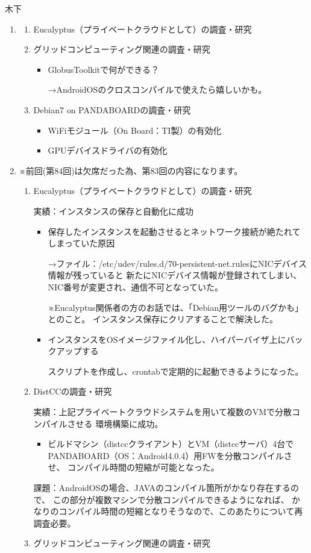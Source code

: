 \documentclass[mingoth,a4paper]{jsarticle}
\begin{document}
\begin{prework}{ 木下 }
  \begin{enumerate}
  \item
    \begin{enumerate}
    \item Eucalyptus（プライベートクラウドとして）の調査・研究
    \item グリッドコンピューティング関連の調査・研究
      \begin{itemize}
      \item GlobusToolkitで何ができる？

        →AndroidOSのクロスコンパイルで使えたら嬉しいかも。
      \end{itemize}
    \item Debian7 on PANDABOARDの調査・研究
      \begin{itemize}
      \item WiFiモジュール（On Board：TI製）の有効化
      \item GPUデバイスドライバの有効化
      \end{itemize}
    \end{enumerate}
  \item ※前回(第84回)は欠席だった為、第83回の内容になります。
    \begin{enumerate}
    \item Eucalyptus（プライベートクラウドとして）の調査・研究

      実績：インスタンスの保存と自動化に成功
      \begin{itemize}
      \item 保存したインスタンスを起動させるとネットワーク接続が絶たれてしまっていた原因

        →ファイル：/etc/udev/rules.d/70-persistent-net.rulesにNICデバイス情報が残っていると
        新たにNICデバイス情報が登録されてしまい、NIC番号が変更され、通信不可となっていた。

        ※Eucalyptus関係者の方のお話では、「Debian用ツールのバグかも」とのこと。
        インスタンス保存にクリアすることで解決した。
      \item インスタンスをOSイメージファイル化し、ハイパーバイザ上にバックアップする

        スクリプトを作成し、crontabで定期的に起動できるようになった。
      \end{itemize}
    \item DistCCの調査・研究

      実績：上記プライベートクラウドシステムを用いて複数のVMで分散コンパイルさせる
      環境構築に成功。
      \begin{itemize}
      \item ビルドマシン（distccクライアント）とVM（distccサーバ）4台で
        PANDABOARD（OS：Android4.0.4）用FWを分散コンパイルさせ、
        コンパイル時間の短縮が可能となった。
      \end{itemize}
      課題：AndroidOSの場合、JAVAのコンパイル箇所がかなり存在するので、
      この部分が複数マシンで分散コンパイルできるようになれば、
      かなりのコンパイル時間の短縮となりそうなので、このあたりについて再調査必要。
    \item グリッドコンピューティング関連の調査・研究


\end{enumerate}
\end{enumerate}
\end{prework}
\end{document}
